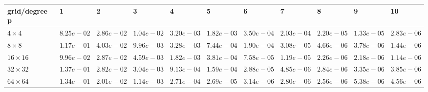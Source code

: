 \begin{tabular}{lllllllllll}
\hline
 grid/degree p   & 1          & 2          & 3          & 4          & 5          & 6          & 7          & 8          & 9          & 10         \\
\hline
 $4 \times 4$    & $8.25e-02$ & $2.86e-02$ & $1.04e-02$ & $3.20e-03$ & $1.82e-03$ & $3.50e-04$ & $2.03e-04$ & $2.20e-05$ & $1.33e-05$ & $2.83e-06$ \\
 $8 \times 8$    & $1.17e-01$ & $4.03e-02$ & $9.96e-03$ & $3.28e-03$ & $7.44e-04$ & $1.90e-04$ & $3.08e-05$ & $4.66e-06$ & $3.78e-06$ & $1.44e-06$ \\
 $16 \times 16$  & $9.96e-02$ & $2.87e-02$ & $4.59e-03$ & $1.82e-03$ & $3.81e-04$ & $7.58e-05$ & $1.19e-05$ & $2.26e-06$ & $2.18e-06$ & $1.14e-06$ \\
 $32 \times 32$  & $1.37e-01$ & $2.82e-02$ & $3.04e-03$ & $9.13e-04$ & $1.59e-04$ & $2.88e-05$ & $4.85e-06$ & $2.84e-06$ & $3.35e-06$ & $3.85e-06$ \\
 $64 \times 64$  & $1.34e-01$ & $2.01e-02$ & $1.14e-03$ & $2.71e-04$ & $2.69e-05$ & $3.14e-06$ & $2.80e-06$ & $2.56e-06$ & $5.38e-06$ & $4.56e-06$ \\
\hline
\end{tabular}